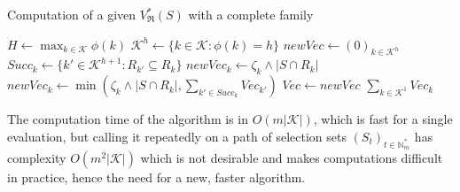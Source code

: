 \documentclass[
  11pt,
  a4paper,
]{article}
\theoremstyle{definition}
\theoremstyle{plain}
\theoremstyle{plain}
\theoremstyle{plain}
\theoremstyle{definition}
\theoremstyle{remark}
\begin{document}
\begin{algorithm}[htb!]
\caption{Computation of a given $V^*_{\mathfrak{R}}(S)$ with a complete family}
\label{alg-vstar}
\begin{algorithmic}[1]
  \State $ H \gets \max_{k\in\mathcal{K}} \phi(k)  $ 
    \State $\mathcal{K}^h\gets \{ k\in\mathcal{K} : \phi(k) =h  \}$
    \State $newVec\gets (0)_{k \in  \mathcal{K}^h}$
      \State $Succ_k \gets \{ k' \in  \mathcal{K}^{h+1} : R_{k'}\subseteq R_k\}$
        \State $newVec_k \gets \zeta_k\wedge|S\cap R_k|$
      \Else
        \State $newVec_k \gets \min\left( \zeta_{k}\wedge|S\cap R_k| ,  \sum_{k'\in Succ_k} Vec_{k'}   \right)$
      \EndIf
    \EndFor
    \State $Vec\gets newVec$
  \EndFor
  \State\Return $\sum_{k\in\mathcal{K}^1} Vec_k  $
\EndProcedure
\end{algorithmic}
\end{algorithm}

The computation time of the algorithm is in \(O(m|\mathcal{K}|)\), which
is fast for a single evaluation, but calling it repeatedly on a path of
selection sets \((S_t)_{t\in\mathbb{N}_m^*}\) has complexity
\(O(m^2|\mathcal{K}|)\) which is not desirable and makes computations
difficult in practice, hence the need for a new, faster algorithm.
\end{document}
